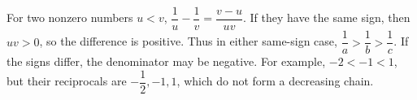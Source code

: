 For two nonzero numbers $u<v$, $\dfrac{1}{u}-\dfrac{1}{v}=\dfrac{v-u}{uv}$. If they have the same sign, then $uv>0$, so the difference is positive. Thus in either same-sign case, $\dfrac{1}{a}>\dfrac{1}{b}>\dfrac{1}{c}$. If the signs differ, the denominator may be negative. For example, $-2<-1<1$, but their reciprocals are $-\dfrac{1}{2},-1,1$, which do not form a decreasing chain.
